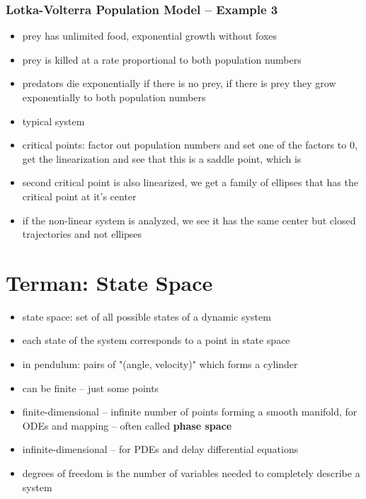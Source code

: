 \documentclass[a4paper,reqno,11pt]{article}
\begin{document}
\subsubsection{Lotka-Volterra Population Model -- Example 3}

\begin{itemize}
    \item prey has unlimited food, exponential growth without foxes
    \item prey is killed at a rate proportional to both population numbers
    \item predators die exponentially if there is no prey, if there is prey
        they grow exponentially to both population numbers
    \item typical system
    \item critical points: factor out population numbers and set one of the
        factors to 0, get the linearization and see that this is a saddle
        point, which is %
    \item second critical point is also linearized, we get a family of ellipses
        that has the critical point at it's center
    \item if the non-linear system is analyzed, we see it has the same center
        but closed trajectories and not ellipses
\end{itemize}

\section{Terman: State Space}

\begin{itemize}
    \item state space: set of all possible states of a dynamic system
    \item each state of the system corresponds to a point in state space
    \item in pendulum: pairs of "(angle, velocity)" which forms a cylinder
    \item can be finite -- just some points
    \item finite-dimensional -- infinite number of points forming a smooth
        manifold, for ODEs and mapping -- often called \textbf{phase space}
    \item infinite-dimensional -- for PDEs and delay differential equations
    \item degrees of freedom is the number of variables needed to completely
        describe a system
\end{itemize}
\end{document}
